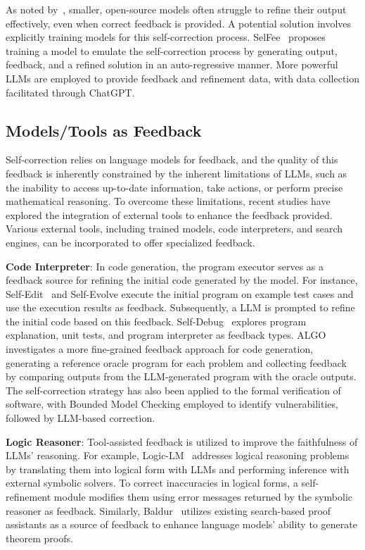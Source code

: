 \documentclass[a4paper,oneside]{book}
\begin{document}
As noted by~\cite{madaan2024self}, smaller, open-source models often struggle to refine their output effectively, even when correct feedback is provided. A potential solution involves explicitly training models for this self-correction process. SelFee~\cite{selfee2023} proposes training a model to emulate the self-correction process by generating output, feedback, and a refined solution in an auto-regressive manner. More powerful LLMs are employed to provide feedback and refinement data, with data collection facilitated through ChatGPT.

\subsection{Models/Tools as Feedback}
Self-correction relies on language models for feedback, and the quality of this feedback is inherently constrained by the inherent limitations of LLMs, such as the inability to access up-to-date information, take actions, or perform precise mathematical reasoning. To overcome these limitations, recent studies have explored the integration of external tools to enhance the feedback provided. Various external tools, including trained models, code interpreters, and search engines, can be incorporated to offer specialized feedback.

\textbf{Code Interpreter}: In code generation, the program executor serves as a feedback source for refining the initial code generated by the model. For instance, Self-Edit~\cite{zhang2023selfedit} and Self-Evolve execute the initial program on example test cases and use the execution results as feedback. Subsequently, a LLM is prompted to refine the initial code based on this feedback. Self-Debug~\cite{chen2023teaching} explores program explanation, unit tests, and program interpreter as feedback types. ALGO~\cite{zhang2023algo} investigates a more fine-grained feedback approach for code generation, generating a reference oracle program for each problem and collecting feedback by comparing outputs from the LLM-generated program with the oracle outputs. The self-correction strategy has also been applied to the formal verification of software, with Bounded Model Checking employed to identify vulnerabilities, followed by LLM-based correction.

\textbf{Logic Reasoner}: Tool-assisted feedback is utilized to improve the faithfulness of LLMs' reasoning. For example, Logic-LM~\cite{pan2023logiclm} addresses logical reasoning problems by translating them into logical form with LLMs and performing inference with external symbolic solvers. To correct inaccuracies in logical forms, a self-refinement module modifies them using error messages returned by the symbolic reasoner as feedback. Similarly, Baldur~\cite{first2023baldur} utilizes existing search-based proof assistants as a source of feedback to enhance language models' ability to generate theorem proofs.
\end{document}
